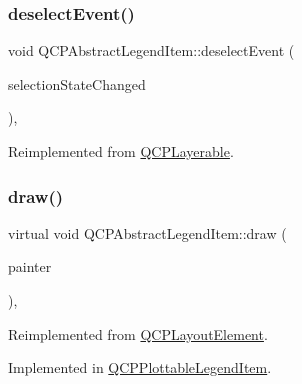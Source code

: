 \mbox{\label{class_q_c_p_abstract_legend_item_aa1c0620558cc8e2a2e6fb7ab558f6097}} 
\subsubsection{\texorpdfstring{deselect\+Event()}{deselectEvent()}}
{\footnotesize\ttfamily void Q\+C\+P\+Abstract\+Legend\+Item\+::deselect\+Event (\begin{DoxyParamCaption}\item[{bool $\ast$}]{selection\+State\+Changed }\end{DoxyParamCaption})\hspace{0.3cm}{\ttfamily [protected]}, {\ttfamily [virtual]}}



Reimplemented from \hyperlink{class_q_c_p_layerable_ae546370644a5551c76af739afc008bee}{Q\+C\+P\+Layerable}.

\mbox{\label{class_q_c_p_abstract_legend_item_a14ce0b09f5b814c765a0d790bd838909}} 
\subsubsection{\texorpdfstring{draw()}{draw()}}
{\footnotesize\ttfamily virtual void Q\+C\+P\+Abstract\+Legend\+Item\+::draw (\begin{DoxyParamCaption}\item[{\hyperlink{class_q_c_p_painter}{Q\+C\+P\+Painter} $\ast$}]{painter }\end{DoxyParamCaption})\hspace{0.3cm}{\ttfamily [protected]}, {}}



Reimplemented from \hyperlink{class_q_c_p_layout_element_ad1c597b1d608cfdd86e7b76819a94cfb}{Q\+C\+P\+Layout\+Element}.



Implemented in \hyperlink{class_q_c_p_plottable_legend_item_a5838366619200e99680afa6d355d13fa}{Q\+C\+P\+Plottable\+Legend\+Item}.

